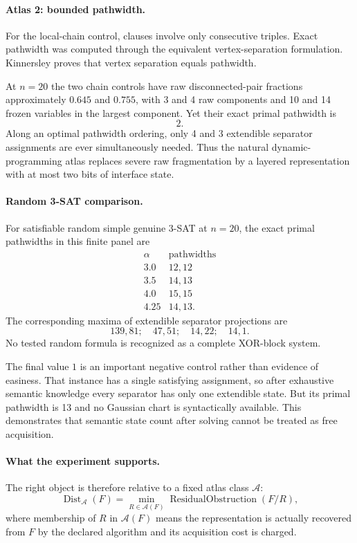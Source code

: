 \paragraph{Atlas 2: bounded pathwidth.}
For the local-chain control, clauses involve only consecutive triples. Exact pathwidth was computed through the equivalent vertex-separation formulation. Kinnersley proves that vertex separation equals pathwidth.

At $n=20$ the two chain controls have raw disconnected-pair fractions approximately $0.645$ and $0.755$, with 3 and 4 raw components and 10 and 14 frozen variables in the largest component. Yet their exact primal pathwidth is
\[ \boxed{2}. \]
Along an optimal pathwidth ordering, only 4 and 3 extendible separator assignments are ever simultaneously needed. Thus the natural dynamic-programming atlas replaces severe raw fragmentation by a layered representation with at most two bits of interface state.

\paragraph{Random 3-SAT comparison.}
For satisfiable random simple genuine 3-SAT at $n=20$, the exact primal pathwidths in this finite panel are
\[
\begin{array}{c|c}
\alpha & \text{pathwidths}\\
\hline
3.0&12,12\\
3.5&14,13\\
4.0&15,15\\
4.25&14,13.
\end{array}
\]
The corresponding maxima of extendible separator projections are
\[ 139,81;\quad 47,51;\quad 14,22;\quad 14,1. \]
No tested random formula is recognized as a complete XOR-block system.

The final value $1$ is an important negative control rather than evidence of easiness. That instance has a single satisfying assignment, so after exhaustive semantic knowledge every separator has only one extendible state. But its primal pathwidth is 13 and no Gaussian chart is syntactically available. This demonstrates that semantic state count after solving cannot be treated as free acquisition.

\paragraph{What the experiment supports.}
The right object is therefore relative to a fixed atlas class $\mathcal A$:
\[
\operatorname{Dist}_{\mathcal A}(F)
=
\min_{R\in\mathcal A(F)}
\operatorname{ResidualObstruction}(F/R),
\]
where membership of $R$ in $\mathcal A(F)$ means the representation is actually recovered from $F$ by the declared algorithm and its acquisition cost is charged.

